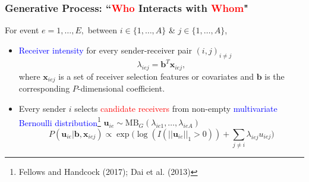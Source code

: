 \documentclass{beamer}
\begin{document}
\begin{frame}
	\frametitle{Generative Process: ``\textcolor{red}{Who} Interacts with \textcolor{red}{Whom}"}
For event $e = 1,\ldots, E,$ between $i \in \{1,\ldots,A\}$ \& $j \in \{1,\ldots,A\}$,\normalsize\vspace{0.15cm}
	\begin{itemize}
		\item \textcolor{blue}{Receiver intensity} for every sender-receiver pair $(i, j)_{i\neq j}$
		\begin{equation*}
		\lambda_{iej} = \boldsymbol{b}^T \boldsymbol{x}_{iej},
		\end{equation*}
		where $\boldsymbol{x}_{iej}$ is a set of receiver selection features or covariates and $\boldsymbol{b}$ is the corresponding $P$-dimensional coefficient. \vspace{0.15cm}
		\item Every sender $i$ selects \textcolor{red}{candidate receivers} from non-empty \textcolor{blue}{multivariate Bernoulli distribution}\footnote{\scriptsize Fellows and Handcock (2017); Dai et al. (2013)} $\boldsymbol{u}_{ie} \sim \mbox{MB}_G ({\lambda}_{ie1},\ldots, {\lambda}_{ieA})$
				\begin{equation*}
			P(\boldsymbol{u}_{ie}|\boldsymbol{b}, \boldsymbol{x}_{iej}) \propto \exp\Big(\log(I(||\boldsymbol{u}_{ie}||_1 > 0))+\sum_{j\neq i} \lambda_{iej}u_{iej}\Big)
				\end{equation*}
	\end{itemize}
	
\end{frame}
\end{document}
